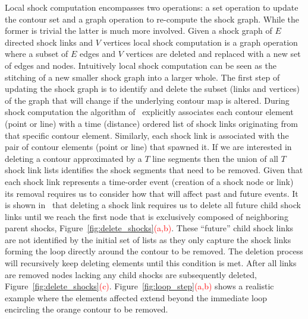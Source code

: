 \begin{appendices}
Local shock computation encompasses two operations: a set operation to update the contour set and a graph operation to re-compute the shock graph. While the former is trivial the latter is much more involved. Given a shock graph of $E$ directed shock links and $V$ vertices local shock computation is a graph operation where a subset of $E$ edges and $V$ vertices are deleted and replaced with a new set of edges and nodes. Intuitively local shock computation can be seen as the stitching of a new smaller shock graph into a larger whole. The first step of updating the shock graph is to identify and delete the subset (links and vertices) of the graph that will change if the underlying contour map is altered.  During shock computation the algorithm of~\cite{Tamrakar:Kimia:Shock} explicitly associates each contour element (point or line) with a time (distance) ordered list of shock links originating from that specific contour element. Similarly, each shock link is associated with the pair of contour elements  (point or line) that spawned it. If we are interested in deleting a contour approximated by a $T$ line segments then the union of all $T$ shock link lists identifies the shock segments that need to be removed. Given that each shock link represents a time-order event (creation of a shock node or link) its removal requires us to consider how that will affect past and future events. It is shown in~\cite{Tamrakar:Kimia:Shock}  that deleting a shock link requires us to delete all future child shock links until we reach the first node that is exclusively composed of neighboring parent shocks, Figure~\ref{fig:delete_shocks}\textcolor{red}{(a,b)}.  These “future” child shock links are not identified by the initial set of lists as they only capture the shock links forming the loop directly around the contour to be removed. The deletion process will recursively keep deleting elements until this condition is met. After all links are removed nodes lacking any child shocks are subsequently deleted, Figure~\ref{fig:delete_shocks}\textcolor{red}{(c)}. Figure~\ref{fig:loop_step}\textcolor{red}{(a,b)} shows a realistic example where the elements affected extend beyond the immediate loop encircling the orange contour to be removed.   



\end{appendices}
